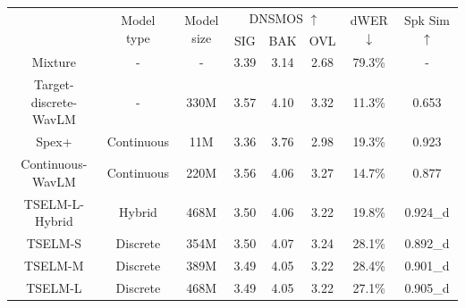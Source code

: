\documentclass[conference]{IEEEtran}
\begin{document}
\begin{table}
    \setlength{\tabcolsep}{12pt} %
    \renewcommand{\arraystretch}{1.3}
    \begin{center}
        \begin{tabular}{cccccccc}
            \Xhline{2\arrayrulewidth} %
            \multirow{2}{*}{System} & \multirow{2}{*}{Model type} & \multirow{2}{*}{Model size} & \multicolumn{3}{c}{ DNSMOS $\uparrow$} & \multirow{2}{*}{dWER $\downarrow$} & \multirow{2}{*}{Spk Sim $\uparrow$} \\
            \cline{4-6}
                                    &                             &                             & SIG     & BAK     & OVL    &                       &                          \\ 
            \hline
            Mixture                 & -                           & -                           & 3.39    & 3.14    & 2.68   & 79.3\%                & -                        \\
            Target-discrete-WavLM   & -                           & 330M                           & 3.57    & 4.10    & 3.32   & 11.3\%                & 0.653                    \\
            \hline
            Spex+                   & Continuous                  & 11M                         & 3.36    & 3.76    & 2.98   & 19.3\%                & 0.923                    \\
            \hline
            Continuous-WavLM       & Continuous                  & 220M                        & 3.56    & 4.06    & 3.27   & 14.7\%                & 0.877                    \\
            TSELM-L-Hybrid          & Hybrid                      & 468M                        & 3.50    & 4.06    & 3.22   & 19.8\%                & 0.924\_d                 \\
            \hline
            TSELM-S                 & Discrete                    & 354M                        & 3.50    & 4.07    & 3.24   & 28.1\%                & 0.892\_d                 \\
            TSELM-M                 & Discrete                    & 389M                        & 3.49    & 4.05    & 3.22   & 28.4\%                & 0.901\_d                 \\
            TSELM-L                 & Discrete                    & 468M                        & 3.49    & 4.05    & 3.22   & 27.1\%                & 0.905\_d \\

\end{tabular}
\end{center}
\end{table}
\end{document}

